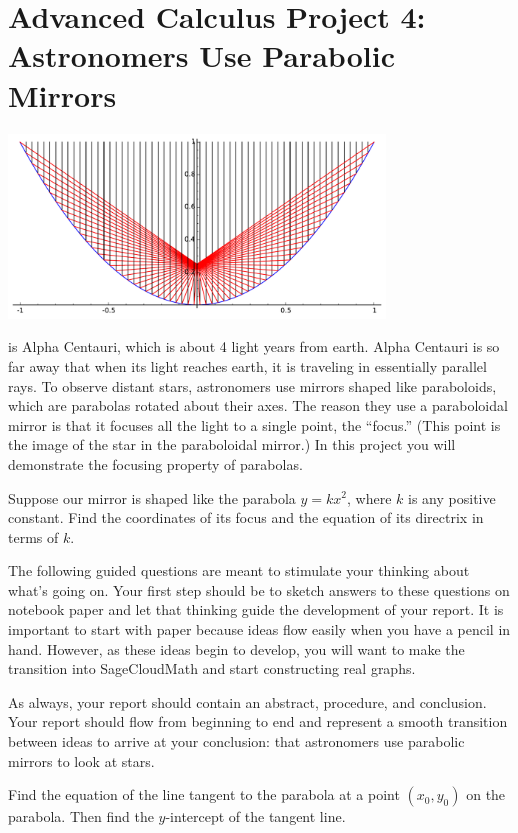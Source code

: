 \documentclass
[justified,nohyper]
{tufte-handout}
\theoremstyle{mydef}
\begin{document}
\section{Advanced Calculus Project 4: Astronomers Use Parabolic Mirrors}

\includegraphics[width=10cm]{parabolic.pdf}

 is Alpha Centauri, which is about 4 light years from earth. Alpha Centauri is so far away that when its light reaches earth, it is traveling in essentially parallel rays. To observe distant stars, astronomers use mirrors shaped like paraboloids, which are parabolas rotated about their axes. The reason they use a paraboloidal mirror is that it focuses all the light to a single point, the ``focus.'' (This point is the image of the star in the paraboloidal mirror.) In this project you will demonstrate the focusing property of parabolas.

Suppose our mirror is shaped like the parabola $y=kx^2$, where $k$ is any positive constant. Find the coordinates of its focus and the equation of its directrix in terms of $k$.

The following guided questions are meant to stimulate your thinking about what's going on. Your first step should be to sketch answers to these questions on notebook paper and let that thinking guide the development of your report. It is important to start with paper because ideas flow easily when you have a pencil in hand. However, as these ideas begin to develop, you will want to make the transition into SageCloudMath and start constructing real graphs.

As always, your report should contain an abstract, procedure, and conclusion. Your report should flow from beginning to end and represent a smooth transition between ideas to arrive at your conclusion: that astronomers use parabolic mirrors to look at stars.

Find the equation of the line tangent to the parabola at a point $(x_0,y_0)$ on the parabola. Then find the $y$-intercept of the tangent line.
\end{document}
